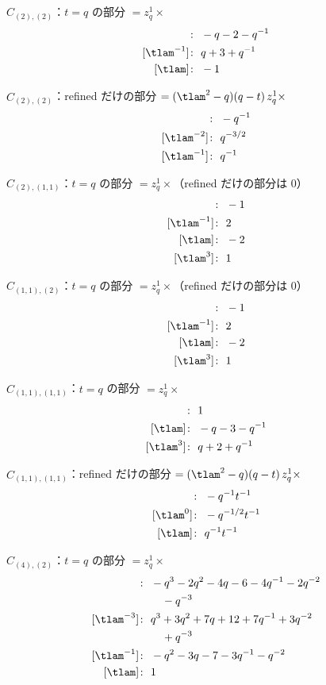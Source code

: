 $\hat C_{(2),(2)}$：$t = q$ の部分 $= z_q^{1} \times$
\begin{align*}
[\tlam^{-3}]\colon\ & -q -2 -q^{-1} \\
[\tlam^{-1}]\colon\ & q +3 +q^{-1} \\
[\tlam]\colon\ & -1
\end{align*}

$\hat C_{(2),(2)}$：refined だけの部分 $= (\tlam^2 - q)(q - t)\, z_q^{1} \times$
\begin{align*}
[\tlam^{-3}]\colon\ & -q^{-1} \\
[\tlam^{-2}]\colon\ & q^{-3/2} \\
[\tlam^{-1}]\colon\ & q^{-1}
\end{align*}

$\hat C_{(2),(1,1)}$：$t = q$ の部分 $= z_q^{1} \times$（refined だけの部分は 0）
\begin{align*}
[\tlam^{-3}]\colon\ & -1 \\
[\tlam^{-1}]\colon\ & 2 \\
[\tlam]\colon\ & -2 \\
[\tlam^{3}]\colon\ & 1
\end{align*}

$\hat C_{(1,1),(2)}$：$t = q$ の部分 $= z_q^{1} \times$（refined だけの部分は 0）
\begin{align*}
[\tlam^{-3}]\colon\ & -1 \\
[\tlam^{-1}]\colon\ & 2 \\
[\tlam]\colon\ & -2 \\
[\tlam^{3}]\colon\ & 1
\end{align*}

$\hat C_{(1,1),(1,1)}$：$t = q$ の部分 $= z_q^{1} \times$
\begin{align*}
[\tlam^{-1}]\colon\ & 1 \\
[\tlam]\colon\ & -q -3 -q^{-1} \\
[\tlam^{3}]\colon\ & q +2 +q^{-1}
\end{align*}

$\hat C_{(1,1),(1,1)}$：refined だけの部分 $= (\tlam^2 - q)(q - t)\, z_q^{1} \times$
\begin{align*}
[\tlam^{-1}]\colon\ & -q^{-1} t^{-1} \\
[\tlam^{0}]\colon\ & -q^{-1/2} t^{-1} \\
[\tlam]\colon\ & q^{-1} t^{-1}
\end{align*}

$\hat C_{(4),(2)}$：$t = q$ の部分 $= z_q^{1} \times$
\begin{align*}
[\tlam^{-5}]\colon\ & -q^{3} -2 q^{2} -4 q -6 -4 q^{-1} -2 q^{-2} \\
& \quad -q^{-3} \\
[\tlam^{-3}]\colon\ & q^{3} +3 q^{2} +7 q +12 +7 q^{-1} +3 q^{-2} \\
& \quad +q^{-3} \\
[\tlam^{-1}]\colon\ & -q^{2} -3 q -7 -3 q^{-1} -q^{-2} \\
[\tlam]\colon\ & 1
\end{align*}

